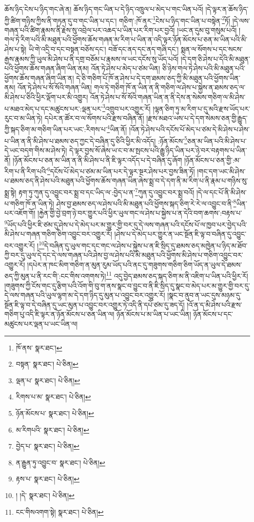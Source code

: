 ཆོས་ཉིད་ངེས་པ་ཉིད་གང་ཞེ་ན། ཆོས་ཉིད་གང་ཡིན་པ་དེ་ཉིད་འཁྲུལ་པ་མེད་པ་གང་ཡིན་པའོ། །དེ་ལྟར་ན་ཆོས་ཉིད་ཀྱི་ཚིག་གཉིས་ཀྱིས་ནི་གཏན་དུ་བ་གང་ཡིན་པ་དང་། གཅིག་:ཁོ་ནར་\footnote{ཁོ་ནས་  སྣར་ཐང་། }ངེས་པ་ཉིད་གང་ཡིན་པ་བསྟེན་\footnote{བསྟན་  སྣར་ཐང་།  པེ་ཅིན། }ཏོ། །དེ་ལས་གཞན་པའི་ཚིག་རྣམས་ནི་རྗེས་སུ་འབྲེལ་པར་འཆད་པ་ཡིན་པར་རིག་པར་བྱའོ། །ཡང་ན་དུམ་བུ་གསུམ་པའོ། །གལ་ཏེ་རིག་པའི་མི་མཐུན་པའི་ཕྱོགས་ཆོས་གཞན་མ་རིག་པ་ཡིན་ན་འདི་ལྟར་ཉོན་མོངས་པ་ཅན་མ་ཡིན་པའི་མི་ཤེས་པ་སྟེ། ཡི་གེ་འདྲི་བ་དང་བསྟན་བཅོས་དང་། བཟོ་དང་ནད་དང་ནད་གཞི་དང་། སྨན་ལ་སོགས་པ་དང་སངས་རྒྱས་རྣམས་ཀྱི་ཡུལ་མི་ཤེས་པ་ནི་དགྲ་བཅོམ་པ་རྣམས་ལ་ཡང་དངོས་སུ་ཡོད་པའོ། །དེ་དག་ཅི་ཤེས་པ་དེའི་མི་མཐུན་པའི་ཕྱོགས་ཆོས་གཞན་ཞིག་ཡིན་ནམ། འོན་ཏེ་ཤེས་པ་མེད་པ་ཙམ་ཡིན། ཅི་ཉེས་གལ་ཏེ་ཤེས་པའི་མི་མཐུན་པའི་ཕྱོགས་ཆོས་གཞན་ཞིག་ཡིན་ན། དེ་ཅི་གཅིག་པོ་ཁོ་ན་ཤེས་པ་དེ་དག་ཐམས་ཅད་ཀྱི་མི་མཐུན་པའི་ཕྱོགས་ཡིན་ནམ། འོན་ཏེ་ཤེས་པ་སོ་སོའི་གཞན་ཡིན། གལ་ཏེ་གཅིག་ཁོ་ན་ཡིན་ན་ནི་གཅིག་ལ་ཤེས་པ་སྐྱེས་ན་ཐམས་ཅད་ལ་མི་ཤེས་པ་ཅིའི་ཕྱིར་ལྡོག་པར་མི་འགྱུར། འོན་ཏེ་ཤེས་པ་སོ་སོའི་གཞན་ཡིན་ན་ནི་དེས་ན་སེམས་གཅིག་ལ་མི་ཤེས་པ་མཐའ་མེད་པ་དང་མཚུངས་པར་:ལྡན་པར་\footnote{ལྡན་པ་  སྣར་ཐང་།  པེ་ཅིན། }འགྲུབ་པར་འགྱུར་རོ། །ལྷན་ཅིག་ཏུ་མ་རིག་པ་དུ་མའི་རྫས་ཡོད་པར་རུང་བ་མ་ཡིན་ཏེ། དཔེར་ན་ཚོར་བ་ལ་སོགས་པའི་རྫས་བཞིན་ནོ། །རྫས་མཐའ་ཡས་པ་དེ་དག་སེམས་ཅན་གྱི་རྒྱུད་ཀྱི་སྐད་ཅིག་མ་གཅིག་ཡིན་པར་ཡང་:རིགས་པ་\footnote{རིགས་པ་མ་  སྣར་ཐང་།  པེ་ཅིན། }ཡིན་ནོ། །འོན་ཏེ་ཤེས་པའི་དངོས་པོ་མེད་པ་ཙམ་དེ་མི་ཤེས་པ་ཤེས་པ་ཡིན་ན་ནི་མི་ཤེས་པ་ཐམས་ཅད་ཀྱང་དེ་བཞིན་དུ་ཅིའི་ཕྱིར་མི་འདོད། :ཉོན་མོངས་\footnote{ཉོན་མོངས་པ་  སྣར་ཐང་།  པེ་ཅིན། }ཅན་མ་ཡིན་པའི་མི་ཤེས་པ་དེ་ཡང་བདག་གིས་མ་ཤེས་ཏེ། དེ་ལྟར་བྱས་སོ་ཞེས་ཡ་ང་བ་མ་སྤངས་པའི་རྒྱུ་ཉིད་ཡིན་པར་ཉེ་བར་བརྟགས་པ་ཡིན་ནོ། །ཉོན་མོངས་པ་ཅན་མ་ཡིན་ན་ནི་མི་ཤེས་པ་ནི་ཇི་ལྟར་འདོད་པ་དེ་བཞིན་དུ་ཞོག །ཉོན་མོངས་པ་ཅན་གྱི་:མ་རིག་པ་ནི་རིག་པའི་\footnote{མ་རིགཔའི་  སྣར་ཐང་།  པེ་ཅིན། }དངོས་པོ་མེད་པ་ཙམ་མ་ཡིན་པར་དེ་ལྟར་སྔར་ཤེས་པར་བྱས་ཟིན་ཏོ། །གང་དག་ཡང་མི་ཤེས་པ་ཐམས་ཅད་ནི་ཤེས་པའི་མཐུན་པའི་ཕྱོགས་ཆོས་གཞན་ཡིན་ཞེས་སྨྲ་བ་དེ་དག་ནི་མ་རིག་པ་ནི་རྣམ་པ་གཉིས་སུ་སྨྲ་སྟེ། རྟག་ཏུ་ཀུན་དུ་འབྱུང་བར་སྨྲ་བ་དང་ཡིད་ལ་:བྱེད་པ་ན་\footnote{བྱེད་པ་  སྣར་ཐང་།  པེ་ཅིན། }ཀུན་དུ་འབྱུང་བར་སྨྲ་བའོ། །དེ་ལ་དང་པོ་ནི་མི་ཤེས་པ་གཅིག་ཁོ་ན་ཡིན་ཏེ། ཤེས་བྱ་ཐམས་ཅད་ལ་ཤེས་པའི་མི་མཐུན་པའི་ཕྱོགས་སྐད་ཅིག་རེ་རེ་ལ་འབྱུང་བ་ནི་\footnote{ན་རྒྱུན་ཏུ་འབྱུང་བ་  སྣར་ཐང་།  པེ་ཅིན། }ཡིན་པར་འཇོག་གོ། །རྐྱེན་གྱི་བྱེ་བྲག་ཉེ་བར་གྱུར་པའི་ཕྱིར་ཡུལ་གང་ལ་ཤེས་པ་སྐྱེས་པ་ན་དེའི་བག་ཆགས་:བརྟས་པ་\footnote{རྟས་པ་  སྣར་ཐང་།  པེ་ཅིན། }ཡོད་པའི་ཕྱིར་ཇི་ཙམ་དུ་ཤེས་པ་དེ་མེད་པར་མ་གྱུར་གྱི་བར་དུ་དེ་ལས་གཞན་པའི་དངོས་པོ་ལ་ཁྱབ་པར་བྱེད་པའི་མི་ཤེས་པ་གཞན་གཅིག་ཅིག་འབྱུང་བར་འགྱུར་རོ། །ཤེས་པ་དེ་མེད་པར་གྱུར་ན་ཡང་སྔོན་ཇི་ལྟ་བ་བཞིན་དུ་འབྱུང་བར་འགྱུར་རོ། །\footnote{། །དེ་  སྣར་ཐང་།  པེ་ཅིན། }དེ་བཞིན་དུ་ཡུལ་གང་དང་གང་ལ་ཤེས་པ་སྐྱེས་པ་ན་ཇི་སྲིད་དུ་ཐམས་ཅད་མཁྱེན་པ་ཉིད་མ་ཐོབ་ཀྱི་བར་དུ་ཡུལ་དེ་དང་དེ་ལས་གཞན་པའི་ཤེས་བྱ་ལ་ཤེས་པའི་མི་མཐུན་པའི་ཕྱོགས་མི་ཤེས་པ་གཅིག་འབྱུང་བར་འགྱུར་རོ། །དཔེར་ན་ཁང་མིག་གཅིག་ན་མུན་རུམ་ཡོད་པའི་ནང་དུ་གཟུགས་གཅིག་ཅིག་ཡོད་ན་ཡུལ་དེ་ཐམས་ཅད་ཀྱི་མུན་པ་ནི་རང་གི་:ངང་གིས་འགགས་ཏེ།\footnote{ངང་གིསའགག་སྟེ།  སྣར་ཐང་།  པེ་ཅིན། } འདུ་བྱེད་ཐམས་ཅད་སྐད་ཅིག་མ་ནི་འཇིག་པ་ཡིན་པའི་ཕྱིར་རོ། །གཟུགས་ཀྱི་ངོས་གང་དུ་རྩིག་པའི་འོག་གི་བུ་ག་ནས་སྣང་བ་བྱུང་བ་ནི་ཇི་སྲིད་དུ་སྣང་བ་མེད་པར་མ་གྱུར་གྱི་བར་དུ་དེ་ལས་གཞན་པའི་ཡུལ་ལྷག་མ་དེ་དག་ཉིད་དུ་མུན་པ་འབྱུང་བར་འགྱུར་རོ། །སྣང་བ་ནུབ་ན་ཡང་དུས་མཉམ་དུ་སྔོན་ཇི་ལྟ་བ་དེ་བཞིན་དུ་ཡང་མུན་པ་འབྱུང་བར་འགྱུར་ཏེ་འདི་ནི་དཔེ་ཙམ་དུ་ཟད་དོ། །འོ་ན་ད་མི་ཤེས་པའི་རྫས་གཅིག་པུ་འདི་ཇི་ལྟར་ན་ཉོན་མོངས་པ་ཅན་ཡིན་ལ། ཉོན་མོངས་པ་མ་ཡིན་པ་ཡང་ཡིན། ཉོན་མོངས་པ་དང་མཚུངས་པར་ལྡན་པ་ཡང་ཡིན་ལ། 